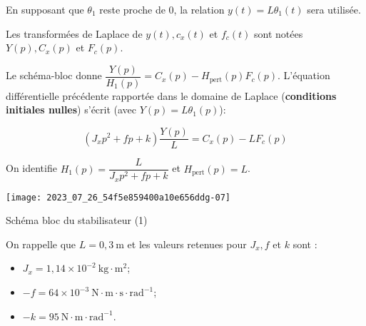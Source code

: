 En supposant que $\theta_{1}$ reste proche de 0, la relation $y(t)=L \theta_{1}(t)$ sera utilisée.

Les transformées de Laplace de $y(t), c_{x}(t)$ et $f_{c}(t)$ sont notées $Y(p), C_{x}(p)$ et $F_{c}(p)$.

\ifprof
\begin{corrige}
Le schéma-bloc donne $\dfrac{Y(p)}{H_1(p)} = C_x(p) - H_{\text{pert}}(p)F_c(p)$. L'équation différentielle précédente rapportée dans le domaine de Laplace (\textbf{conditions initiales nulles}) s'écrit (avec $Y(p) = L \theta_1(p)$):

$$ \left( J_x p^2 + f p + k \right)\dfrac{Y(p)}{L} = C_x(p) - L F_c(p) $$

On identifie $\boxed{H_1(p) = \dfrac{L}{J_x p^2 + f p + k}}$ et $\boxed{H_{\text{pert}}(p) = L}$.
\end{corrige}
\else
\fi


\begin{marginfigure}
\texttt{[image: 2023\_07\_26\_54f5e859400a10e656ddg-07]}
\caption{\label{fig:10}Schéma bloc du stabilisateur (1)}
\end{marginfigure}

On rappelle que $L=0,3 \mathrm{~m}$ et les valeurs retenues pour $J_{x}, f$ et $k$ sont :

\begin{itemize}
  \item $J_{x}=1,14 \times 10^{-2} \mathrm{~kg} \cdot \mathrm{m}^{2}$;

  \item $-f=64 \times 10^{-3} \mathrm{~N} \cdot \mathrm{m} \cdot \mathrm{s} \cdot \mathrm{rad}^{-1}$;

  \item $-k=95 \mathrm{~N} \cdot \mathrm{m} \cdot \mathrm{rad}^{-1}$.
\end{itemize}

